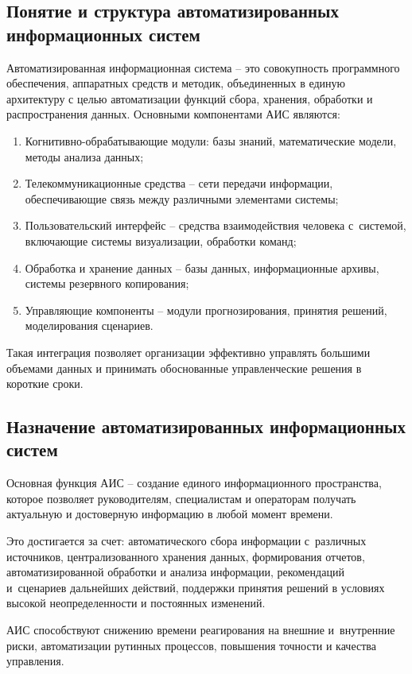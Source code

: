 \documentclass{ou}
\begin{document}
\subsection{Понятие и структура автоматизированных информационных систем}
Автоматизированная информационная система -- это совокупность программного обеспечения, аппаратных средств и методик, объединенных в единую архитектуру с целью автоматизации функций сбора, хранения, обработки и распространения данных. Основными компонентами АИС являются:
\begin{enumerate}[leftmargin=0em, itemindent=3.75em, nosep, label=\arabic*)]
\item Когнитивно-обрабатывающие модули: базы знаний, математические модели, методы анализа данных;
\item Телекоммуникационные средства -- сети передачи информации, обеспечивающие связь между различными элементами системы;
\item Пользовательский интерфейс -- средства взаимодействия человека с~системой, включающие системы визуализации, обработки команд;
\item Обработка и хранение данных -- базы данных, информационные архивы, системы резервного копирования;
\item Управляющие компоненты -- модули прогнозирования, принятия решений, моделирования сценариев.
\end{enumerate}

Такая интеграция позволяет организации эффективно управлять большими объемами данных и принимать обоснованные управленческие решения в короткие сроки.
\subsection{Назначение автоматизированных информационных систем}
Основная функция АИС -- создание единого информационного пространства, которое позволяет руководителям, специалистам и операторам получать актуальную и достоверную информацию в любой момент времени.

Это достигается за счет: автоматического сбора информации с~различных источников, централизованного хранения данных, формирования отчетов, автоматизированной обработки и анализа информации, рекомендаций и~сценариев дальнейших действий, поддержки принятия решений в условиях высокой неопределенности и постоянных изменений.

АИС способствуют снижению времени реагирования на внешние и~внутренние риски, автоматизации рутинных процессов, повышения точности и качества управления.
\end{document}
